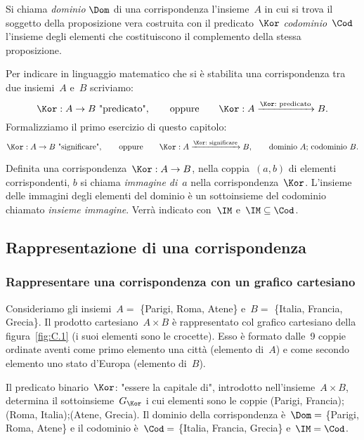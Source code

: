 \begin{definizione}
Si chiama \emph{dominio} $\Dom$ di una corrispondenza l'insieme~$A$ in cui si 
trova il soggetto della proposizione vera costruita con il predicato~$\Kor$ 
\emph{codominio}~$\Cod$
l'insieme degli elementi che costituiscono il complemento della stessa 
proposizione.
\end{definizione}

Per indicare in linguaggio matematico che si è stabilita una corrispondenza tra 
due insiemi~$A$ e~$B$ scriviamo:
\[\Kor:A \rightarrow B\text{ "predicato"}, \qquad \text{oppure} \qquad \Kor:A 
\xrightarrow{\Kor:\text{ predicato}} B.\]
Formalizziamo il primo esercizio di questo capitolo:
\[\Kor:A \rightarrow B \textrm{ "significare"},\qquad \text{oppure} \qquad 
\Kor:A \xrightarrow{\Kor:\text{ significare}} B,\qquad \text{dominio } A \text{; 
codominio } B. \]

\begin{definizione}
Definita una corrispondenza~$\Kor:A \rightarrow B$, nella coppia~$(a,b)$ di 
elementi corrispondenti, $b$ si chiama \emph{immagine di}~$a$ nella 
corrispondenza~$\Kor$.
L'insieme delle immagini degli elementi del dominio è un sottoinsieme del 
codominio chiamato \emph{insieme immagine}. Verrà indicato con~$\IM$ e~$\IM 
\subseteq\Cod$.
\end{definizione}

\subsection{Rappresentazione di una corrispondenza}
\label{subsec:corr_rappresentazione}

\subsubsection{Rappresentare una corrispondenza con un grafico cartesiano}
\begin{exrig}
\begin{esempio}
Consideriamo gli insiemi~$A=$ \{Parigi, Roma, Atene\} e~$B=$ \{Italia, Francia, 
Grecia\}. Il prodotto cartesiano~$A \times B$ è rappresentato col grafico 
cartesiano della
figura~\ref{fig:C.1} (i suoi elementi sono le crocette).
Esso è formato dalle~9 coppie ordinate aventi come primo elemento una città 
(elemento di~$A$) e come secondo elemento uno stato d'Europa (elemento di~$B$).

Il predicato binario~$\Kor$: "essere la capitale di", introdotto nell'insieme~$A 
\times B$, determina il sottoinsieme~$G_\Kor$ i cui elementi sono le coppie 
(Parigi, Francia);
(Roma, Italia);(Atene, Grecia). Il dominio della corrispondenza è~$\Dom=$ 
\{Parigi, Roma, Atene\} e il codominio è~$\Cod=$ \{Italia, Francia, Grecia\} 
e~$\IM=\Cod$.
\end{esempio}
\end{exrig}

